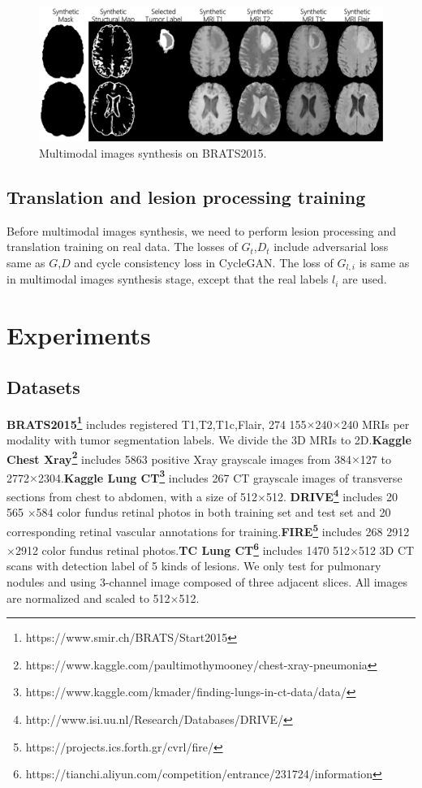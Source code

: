 \documentclass[runningheads]{llncs}
\begin{document}
	\begin{figure}[thbp!]
		\centering
		\includegraphics[width=0.55\linewidth]{figures/F_to_MRI}
		\caption{Multimodal images synthesis on BRATS2015.}
		\label{generated_mri}
	\end{figure}
	\subsection{Translation and lesion processing training}
	Before multimodal images synthesis, we need to perform lesion processing and translation training on real data. The losses of $G_t$,$D_t$ include adversarial loss same as $G$,$D$ and cycle consistency loss in CycleGAN.
	The loss of $G_{l,i}$ is same as in multimodal images synthesis stage, except that the real labels $l_i$ are used.
	\section{Experiments}
	\subsection{Datasets}
	\textbf{BRATS2015\footnote{https://www.smir.ch/BRATS/Start2015}} includes registered T1,T2,T1c,Flair, 274 155$\times$240$\times$240 MRIs per modality with tumor segmentation labels. We divide the 3D MRIs to 2D.\textbf{Kaggle Chest Xray\footnote{https://www.kaggle.com/paultimothymooney/chest-xray-pneumonia }} includes 5863 positive Xray grayscale images from 384$\times$127 to 2772$\times$2304.\textbf{Kaggle Lung CT\footnote{https://www.kaggle.com/kmader/finding-lungs-in-ct-data/data/}} includes 267 CT grayscale images of transverse sections from chest to abdomen, with a size of 512$\times$512. \textbf{DRIVE\footnote{http://www.isi.uu.nl/Research/Databases/DRIVE/}} includes 20 565 $\times $584 color fundus retinal photos in both training set and test set and 20 corresponding retinal vascular annotations for training.\textbf{FIRE\footnote{https://projects.ics.forth.gr/cvrl/fire/}} includes 268 2912$\times$2912 color fundus retinal photos.\textbf{TC Lung CT\footnote{https://tianchi.aliyun.com/competition/entrance/231724/information}} includes 1470 512$\times$512 3D CT scans with detection label of 5 kinds of lesions. We only test for pulmonary nodules and using 3-channel image composed of three adjacent slices. All images are normalized and scaled to 512$\times$512.
	
\end{document}
